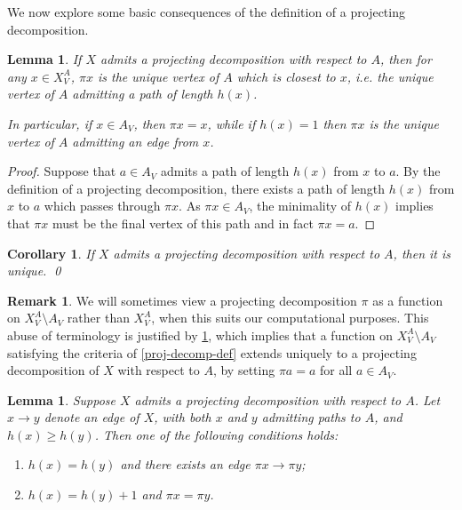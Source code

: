 \documentclass[11pt]{article}
\newtheorem{corollary}[theo]{Corollary}
\newtheorem{lemma}[theo]{Lemma}
\theoremstyle{definition}
\newtheorem{remark}[theo]{Remark}
\numberwithin{equation}{section}
\begin{document}
We now explore some basic consequences of the definition of a projecting decomposition.

\begin{lemma}\label{pi-closest}
If $X$ admits a projecting decomposition with respect to $A$, then for any $x \in X_{V}^A$, $\pi x$ is the unique vertex of $A$ which is closest to $x$, i.e. the unique vertex of $A$ admitting a path of length $h(x)$.

In particular, if $x \in A_V$, then $\pi x = x$, while if $h(x) = 1$ then $\pi x$ is the unique vertex of $A$ admitting an edge from $x$.
\end{lemma}

\begin{proof}
Suppose that $a \in A_V$ admits a path of length $h(x)$ from $x$ to $a$. By the definition of a projecting decomposition, there exists a path of length $h(x)$ from $x$ to $a$ which passes through $\pi x$. As $\pi x \in A_V$, the minimality of $h(x)$ implies that $\pi x$ must be the final vertex of this path and in fact $\pi x = a$.
\end{proof}

\begin{corollary}
If $X$ admits a projecting decomposition with respect to $A$, then it is unique. \qed
\end{corollary}

\begin{remark}\label{rmk:projecting_alternative} We will sometimes view a projecting decomposition $\pi$ as a function on $X^A_V \setminus A_V$ rather than $X^A_V$, when this suits our computational purposes. This abuse of terminology is justified by \cref{pi-closest}, which implies that a function on $X^A_V \setminus A_V$ satisfying the criteria of \cref{proj-decomp-def} extends uniquely to a projecting decomposition of $X$ with respect to $A$, by setting $\pi a = a$ for all $a \in A_V$.
\end{remark}

\begin{lemma}\label{pi-edges}
Suppose $X$ admits a projecting decomposition with respect to $A$.
Let $x \to y$ denote an edge of $X$, with both $x$ and $y$ admitting paths to $A$, and $h(x) \geq h(y)$.
Then one of the following conditions holds:
\begin{enumerate}
    \item \label{pi-edges-equal} $h(x) = h(y)$ and there exists an edge $\pi x \to \pi y$;
    \item \label{pi-edges-greater} $h(x) = h(y) + 1$ and $\pi x = \pi y$.
\end{enumerate}
\end{lemma}
\end{document}
